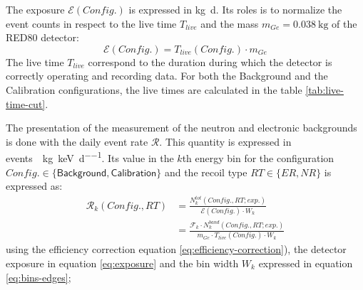 
The exposure $\mathcal{E}(Config.)$ is expressed in \si{\kg \day}. Its roles is to normalize the event counts in respect to the live time $T_{live}$ and the mass $m_{Ge} = \SI{0.038}{\kg}$ of the RED80 detector:
\begin{equation}
\label{eq:exposure}
\mathcal{E}(Config.) = T_{live} (Config.) \cdot m_{Ge}
\end{equation}
The live time $T_{live}$ correspond to the duration during which the detector is correctly operating and recording data. For both the Background and the Calibration configurations, the live times are calculated in the table \ref{tab:live-time-cut}.


The presentation of the measurement of the neutron and electronic backgrounds is done with the daily event rate $\mathcal{R}$. This quantity is expressed in \si{events \per \kg \per \kilo\eV \per \day}. Its value in the $k$th energy bin for the configuration $Config. \in \{ \textsf{Background}, \textsf{Calibration} \}$ and the recoil type $RT \in \{ ER, NR\}$ is expressed as:
\begin{align}
\mathcal{R}_k(Config., RT) 
&=
\frac{ N_k^{tot} (Config., RT; exp.) }{ \mathcal{E} (Config.) \cdot W_k}
\\
&=
\frac{ \mathcal{F}_k \cdot N_k^{band} (Config., RT; exp.) }{ m_{Ge} \cdot T_{live}(Config.) \cdot W_k}
\end{align}
using the efficiency correction equation \ref{eq:efficiency-correction}), the detector exposure in equation \ref{eq:exposure}
and the bin width $W_k$ expressed in equation \ref{eq:bins-edges};


